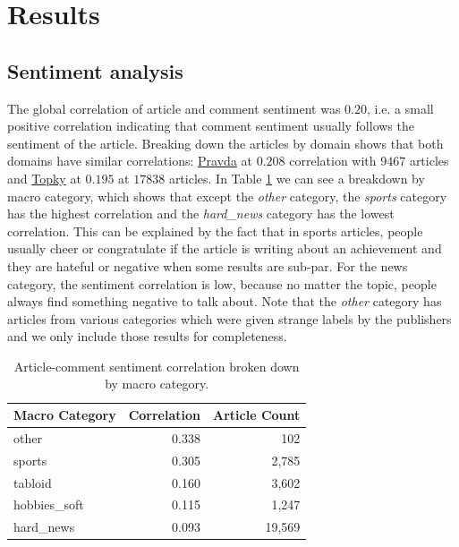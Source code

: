 \documentclass[11pt,a4paper]{article}
\def\topky{\href{https://topky.sk}{Topky}}
\def\pravda{\href{https://pravda.sk}{Pravda}}
\begin{document}
\section{Results}

\subsection{Sentiment analysis}
The global correlation of article and comment sentiment was $0.20$, i.e. a small positive correlation indicating that comment sentiment usually follows the sentiment of the article. Breaking down the articles by domain shows that both domains have similar correlations: \pravda{} at $0.208$ correlation with $9467$ articles and \topky{} at $0.195$ at $17838$ articles. In Table \ref{tab:sentiment_category} we can see a breakdown by macro category, which shows that except the \textit{other} category, the \textit{sports} category has the highest correlation and the \textit{hard\_news} category has the lowest correlation. This can be explained by the fact that in sports articles, people usually cheer or congratulate if the article is writing about an achievement and they are hateful or negative when some results are sub-par. For the news category, the sentiment correlation is low, because no matter the topic, people always find something negative to talk about. Note that the \textit{other} category has articles from various categories which were given strange labels by the publishers and we only include those results for completeness.

\begin{table}[H]
	\centering
	\small
	\begin{tabular}{@{}lrr@{}}
		\toprule
		\textbf{Macro Category} & \textbf{Correlation} & \textbf{Article Count} \\ \midrule
		other                   & 0.338                & 102                    \\
		sports                  & 0.305                & 2,785                  \\
		tabloid                 & 0.160                & 3,602                  \\
		hobbies\_soft           & 0.115                & 1,247                  \\
		hard\_news              & 0.093                & 19,569                 \\ \bottomrule
	\end{tabular}
	\caption{Article-comment sentiment correlation broken down by macro category.}
	\label{tab:sentiment_category}
\end{table}
\end{document}
